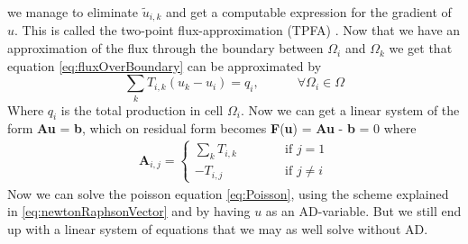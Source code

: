 we manage to eliminate $\tilde{u}_{i,k}$ and get a computable expression for the gradient of $u$. This is called the two-point flux-approximation (TPFA) \emph{\citep{lieMrstUrl}}. Now that we have an approximation of the flux through the boundary between $\Omega_i$ and $\Omega_k$ we get that equation \eqref{eq:fluxOverBoundary} can be approximated by 
\begin{equation*}
    \sum_k T_{i,k}(u_k - u_i) = q_i, \hspace{3em} \forall \Omega_i \in \Omega
\end{equation*}
Where $q_i$ is the total production in cell $\Omega_i$. Now we can get a linear system of the form \textbf{A}\textbf{u} = \textbf{b},  which on residual form becomes \textbf{F}(\textbf{u}) = \textbf{A}\textbf{u} - \textbf{b} = 0 where
\begin{align*}
    \textbf{A}_{i,j} = 
    \left\lbrace
    \begin{array}{lr}
    \sum_k T_{i,k} \hspace{3em}&\text{if } j = 1\\
    -T_{i,j} \hspace{3em}&\text{if } j \neq i
    \end{array}
    \right.
\end{align*}
Now we can solve the poisson equation \eqref{eq:Poisson}, using the scheme explained in \eqref{eq:newtonRaphsonVector} and by having $u$ as an AD-variable. But we still end up with a linear system of equations that we may as well solve without AD. 

